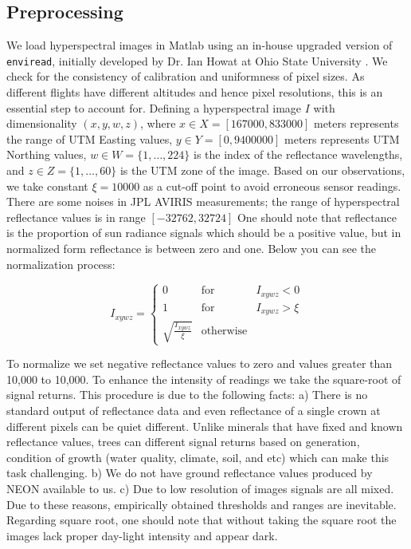 \documentclass[remotesensing,article,accept,moreauthors,pdftex,12pt,a4paper]{mdpi}
\begin{document}
\subsection{Preprocessing}

We load hyperspectral images in Matlab using an in-house upgraded version of \texttt{enviread}, initially developed by Dr. Ian Howat at Ohio State University \cite{howat2007enviread}. We check for the consistency of calibration and uniformness of pixel sizes. As different flights have different altitudes and hence pixel resolutions, this is an essential step to account for. Defining a hyperspectral image $I$ with dimensionality $(x,y,w,z)$, where $x \in X = [167000, 833000 ]$ meters represents the range of UTM Easting values, $y \in Y = [0, 9400000]$ meters represents UTM Northing values, $w \in W = \{1, \dotsc, 224\}$ is the index of the reflectance wavelengths, and $z \in Z = \{1, \dotsc, 60 \}$ is the UTM zone of the image. Based on our observations, we take constant $\xi = 10000$ as a cut-off point to avoid erroneous sensor readings. There are some noises in JPL AVIRIS measurements; the range of hyperspectral reflectance values is in range $[-32762, 32724]$ One should note that reflectance is the proportion of sun radiance signals which should be a positive value, but in normalized form reflectance is between zero and one. Below you can see the normalization process:

\begin{equation}
I_{xywz} = \left\{ \begin{array}{rcl}
0 & \mbox{for} & I_{xywz} < 0 \\ 
1 & \mbox{for} & I_{xywz} > \xi \\
\sqrt{\frac{I_{xywz}}{\xi}} & \mbox{otherwise} & 
\end{array}\right.
\end{equation}

To normalize we set negative reflectance values to zero and values greater than 10,000 to 10,000. To enhance the intensity of readings we take the square-root of signal returns. This procedure is due to the following facts: a) There is no standard output of reflectance data and even reflectance of a single crown at different pixels can be quiet different. Unlike minerals that have fixed and known reflectance values, trees can different signal returns based on generation, condition of growth (water quality, climate, soil, and etc) which can make this task challenging. b) We do not have ground reflectance values produced by NEON available to us. c) Due to low resolution of images signals are all mixed. Due to these reasons, empirically obtained thresholds and ranges are inevitable. Regarding square root, one should note that without taking the square root the images lack proper day-light intensity and appear dark.
\end{document}
